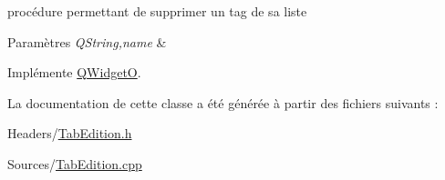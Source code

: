 procédure permettant de supprimer un tag de sa liste 


\begin{DoxyParams}{Paramètres}
{\em Q\+String,name} & \\
\hline
\end{DoxyParams}


Implémente \hyperlink{class_q_widget_o_a917af7ef0578b09dc8d60f1101ea14a7}{Q\+WidgetO}.



La documentation de cette classe a été générée à partir des fichiers suivants \+:\begin{DoxyCompactItemize}
\item 
Headers/\hyperlink{_tab_edition_8h}{Tab\+Edition.\+h}\item 
Sources/\hyperlink{_tab_edition_8cpp}{Tab\+Edition.\+cpp}\end{DoxyCompactItemize}
